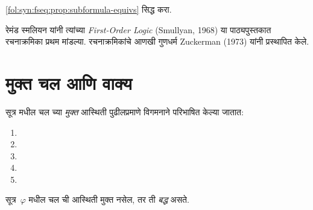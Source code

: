 \begin{prob}
\ref{fol:syn:fseq:prop:subformula-equivs} सिद्ध करा.
\end{prob}

\begin{history}
रेमंड स्मलियन यांनी त्यांच्या \emph{First-Order Logic}
(Smullyan, 1968) या पाठ्यपुस्तकात रचनाक्रमिका प्रथम मांडल्या.
रचनाक्रमिकांचे आणखी गुणधर्म Zuckerman (1973) यांनी प्रस्थापित केले.
\end{history}












\section{मुक्त चल आणि वाक्य}\label{fol:syn:fvs:sec}

\begin{defn}[चल च्या मुक्त आस्थिती]
\label{fol:syn:fvs:defn:free-occ}
सूत्र मधील चल च्या \emph{मुक्त} आस्थिती पुढीलप्रमाणे
विगमनाने परिभाषित केल्या जातात:
\begin{enumerate}
\item {}

\item {}

\item {}

\item {}

\item {}
\end{enumerate}
\end{defn}

\begin{defn}[बद्ध चरे]
सूत्र~$\varphi$ मधील चल ची आस्थिती मुक्त नसेल, तर ती
\emph{बद्ध} असते.
\end{defn}

